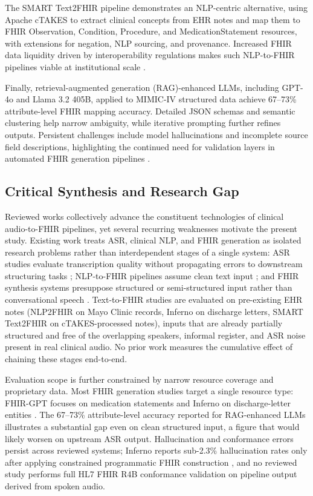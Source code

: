The SMART Text2FHIR pipeline demonstrates an NLP-centric alternative, using Apache cTAKES to extract clinical concepts from EHR notes and map them to FHIR Observation, Condition, Procedure, and MedicationStatement resources, with extensions for negation, NLP sourcing, and provenance. Increased FHIR data liquidity driven by interoperability regulations makes such NLP-to-FHIR pipelines viable at institutional scale \cite{miller2023smart}.

Finally, retrieval-augmented generation (RAG)-enhanced LLMs, including GPT-4o and Llama 3.2 405B, applied to MIMIC-IV structured data achieve 67–73\% attribute-level FHIR mapping accuracy. Detailed JSON schemas and semantic clustering help narrow ambiguity, while iterative prompting further refines outputs. Persistent challenges include model hallucinations and incomplete source field descriptions, highlighting the continued need for validation layers in automated FHIR generation pipelines \cite{riquelme2025llm}.

\subsection{Critical Synthesis and Research Gap}

Reviewed works collectively advance the constituent technologies of clinical audio-to-FHIR pipelines, yet several recurring weaknesses motivate the present study. Existing work treats ASR, clinical NLP, and FHIR generation as isolated research problems rather than interdependent stages of a single system: ASR studies evaluate transcription quality without propagating errors to downstream structuring tasks \cite{tran2022asr, radford2023whisper, adedeji2024sound}; NLP-to-FHIR pipelines assume clean text input \cite{hong2020nlp2fhir, brens2025semantic, miller2023smart}; and FHIR synthesis systems presuppose structured or semi-structured input rather than conversational speech \cite{li2024fhirgpt, frei2025inferno, riquelme2025llm}. Text-to-FHIR studies are evaluated on pre-existing EHR notes (NLP2FHIR on Mayo Clinic records, Inferno on discharge letters, SMART Text2FHIR on cTAKES-processed notes), inputs that are already partially structured and free of the overlapping speakers, informal register, and ASR noise present in real clinical audio. No prior work measures the cumulative effect of chaining these stages end-to-end.

Evaluation scope is further constrained by narrow resource coverage and proprietary data. Most FHIR generation studies target a single resource type: FHIR-GPT focuses on medication statements \cite{li2024fhirgpt} and Inferno on discharge-letter entities \cite{frei2025inferno}. The 67--73\% attribute-level accuracy reported for RAG-enhanced LLMs \cite{riquelme2025llm} illustrates a substantial gap even on clean structured input, a figure that would likely worsen on upstream ASR output. Hallucination and conformance errors persist across reviewed systems; Inferno reports sub-2.3\% hallucination rates only after applying constrained programmatic FHIR construction \cite{frei2025inferno}, and no reviewed study performs full HL7 FHIR R4B conformance validation on pipeline output derived from spoken audio.

